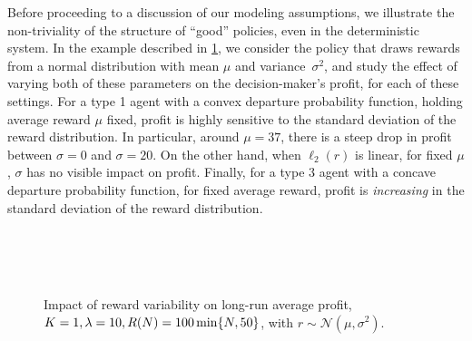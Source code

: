\documentclass[12pt]{article}
\begin{document}
Before proceeding to a discussion of our modeling assumptions, we illustrate the non-triviality of the structure of ``good'' policies, even in the deterministic system. 
 In the example described in \cref{fig:normal-variance}, we consider the policy that draws rewards from a normal distribution with mean $\mu$ and variance~$\sigma^2$, and study the effect of varying both of these parameters on the decision-maker's profit, for each of these settings. 
For a type 1 agent with a convex departure probability function, holding average reward $\mu$ fixed, profit is highly sensitive to the standard deviation of the reward distribution. In particular, around $\mu = 37$, there is a steep drop in profit between $\sigma = 0$ and $\sigma = 20$. On the other hand, when $\ell_2(r)$ is linear, for fixed $\mu$, $\sigma$ has no visible impact on profit. Finally, for a type 3 agent with a concave departure probability function, for fixed average reward, profit is {\it increasing} in the standard deviation of the reward distribution. 

% 

\begin{figure}
     \centering
      \\
     \\
     \\
    \caption{\centering Impact of reward variability on long-run average profit, $K = 1, \lambda = 10, R(N) = 100\min\{N,50\}$, with $r \sim \mathcal{N}(\mu,\sigma^2)$.}
    \label{fig:normal-variance}
\end{figure}
\end{document}
